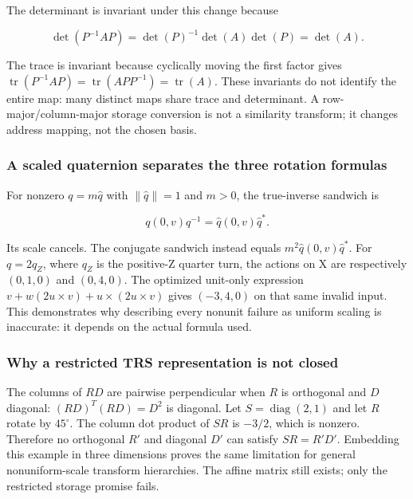 The determinant is invariant under this change because

\[
\det(P^{-1}AP)=\det(P)^{-1}\det(A)\det(P)=\det(A).
\]

The trace is invariant because cyclically moving the first factor gives \(\operatorname{tr}(P^{-1}AP)=\operatorname{tr}(APP^{-1})=\operatorname{tr}(A)\). These invariants do not identify the entire map: many distinct maps share trace and determinant. A row-major/column-major storage conversion is not a similarity transform; it changes address mapping, not the chosen basis.

\subsubsection{A scaled quaternion separates the three rotation formulas}\label{02-foundations-ii-ch039-a-scaled-quaternion-separates-the-three-rotation-formulas}

\hypertarget{02-foundations-ii-ch039-a-scaled-quaternion-separates-the-three-rotation-formulas}{}

For nonzero \(q=m\widehat q\) with \(\|\widehat q\|=1\) and \(m>0\), the true-inverse sandwich is

\[
q(0,v)q^{-1}=\widehat q(0,v)\widehat q^*.
\]

Its scale cancels. The conjugate sandwich instead equals \(m^2\widehat q(0,v)\widehat q^*\). For \(q=2q_Z\), where \(q_Z\) is the positive-Z quarter turn, the actions on X are respectively \((0,1,0)\) and \((0,4,0)\). The optimized unit-only expression \(v+w(2u\times v)+u\times(2u\times v)\) gives \((-3,4,0)\) on that same invalid input. This demonstrates why describing every nonunit failure as uniform scaling is inaccurate: it depends on the actual formula used.

\subsubsection{Why a restricted TRS representation is not closed}\label{02-foundations-ii-ch039-why-a-restricted-trs-representation-is-not-closed}

\hypertarget{02-foundations-ii-ch039-why-a-restricted-trs-representation-is-not-closed}{}

The columns of \(RD\) are pairwise perpendicular when \(R\) is orthogonal and \(D\) diagonal: \((RD)^T(RD)=D^2\) is diagonal. Let \(S=\operatorname{diag}(2,1)\) and let \(R\) rotate by \(45^\circ\). The column dot product of \(SR\) is \(-3/2\), which is nonzero. Therefore no orthogonal \(R'\) and diagonal \(D'\) can satisfy \(SR=R'D'\). Embedding this example in three dimensions proves the same limitation for general nonuniform-scale transform hierarchies. The affine matrix still exists; only the restricted storage promise fails.

